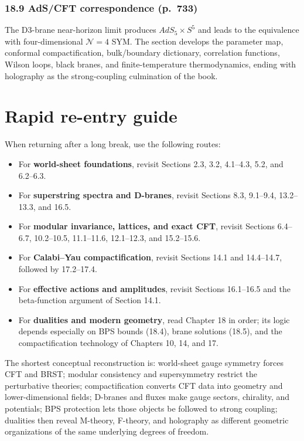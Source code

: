 \documentclass[
  10pt,
  a4paper,
  openany]{book}
\providecommand{\tightlist}{%
  \setlength{\itemsep}{0pt}\setlength{\parskip}{0pt}}
\begin{document}
\subsubsection{18.9 AdS/CFT correspondence
(p.~733)}\label{adscft-correspondence-p.-733}

The D3-brane near-horizon limit produces \(AdS_5\times S^5\) and leads
to the equivalence with four-dimensional \(\mathcal N=4\) SYM. The
section develops the parameter map, conformal compactification,
bulk/boundary dictionary, correlation functions, Wilson loops, black
branes, and finite-temperature thermodynamics, ending with holography as
the strong-coupling culmination of the book.

\section{Rapid re-entry guide}\label{rapid-re-entry-guide}

When returning after a long break, use the following routes:

\begin{itemize}
\tightlist
\item
  For \textbf{world-sheet foundations}, revisit Sections 2.3, 3.2,
  4.1--4.3, 5.2, and 6.2--6.3.
\item
  For \textbf{superstring spectra and D-branes}, revisit Sections 8.3,
  9.1--9.4, 13.2--13.3, and 16.5.
\item
  For \textbf{modular invariance, lattices, and exact CFT}, revisit
  Sections 6.4--6.7, 10.2--10.5, 11.1--11.6, 12.1--12.3, and 15.2--15.6.
\item
  For \textbf{Calabi--Yau compactification}, revisit Sections 14.1 and
  14.4--14.7, followed by 17.2--17.4.
\item
  For \textbf{effective actions and amplitudes}, revisit Sections
  16.1--16.5 and the beta-function argument of Section 14.1.
\item
  For \textbf{dualities and modern geometry}, read Chapter 18 in order;
  its logic depends especially on BPS bounds (18.4), brane solutions
  (18.5), and the compactification technology of Chapters 10, 14, and
  17.
\end{itemize}

The shortest conceptual reconstruction is: world-sheet gauge symmetry
forces CFT and BRST; modular consistency and supersymmetry restrict the
perturbative theories; compactification converts CFT data into geometry
and lower-dimensional fields; D-branes and fluxes make gauge sectors,
chirality, and potentials; BPS protection lets those objects be followed
to strong coupling; dualities then reveal M-theory, F-theory, and
holography as different geometric organizations of the same underlying
degrees of freedom.

\backmatter
\end{document}
